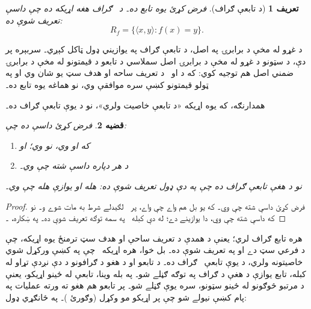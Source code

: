 \documentclass[12pt,a4paper,oneside]{report}
\newcommand{\Setabs}[2]{\{#1 : #2\}}
\newcommand{\tuple}[1]{\langle #1\rangle}
\newcommand{\ollabel}[1]{\label{\pspart:\pschapter:\pssection:#1}}
\newenvironment{explain}{}{}
\newtheorem{defn}{تعريف}[section]
\newtheorem{prop}[defn]{قضيه}
\begin{document}
\begin{defn}[د تابعې ګراف]فرض کړئ  يوه تابع ده۔
د~ \emph{ګراف} هغه اړيکه  ده چې داسې
تعريف شوې ده:
\[
R_f = \Setabs{\tuple{x,y}}{f(x) = y}.
\]
\end{defn}

\begin{explain}
د غړو له مخې د برابرۍ په اصل، د تابعې ګراف په يوازيني ډول ټاکل
کېږي۔ سربېره پر دې، د سټونو د غړو له مخې د برابرۍ اصل سملاسي
د تابعو د قيمتونو له مخې د برابرۍ ضمني اصل هم توجيه کوي: که د
 او~ د تعريف ساحه او هدف سټ يو شان وي او په ټولو قيمتونو
کښې سره موافقې وي، نو هماغه يوه تابع ده۔

همدارنګه، که يوه اړيکه «د تابعې خاصيت ولري»، نو د يوې تابعې ګراف ده۔
\end{explain}

\begin{prop}\ollabel{prop:graph-function}
فرض کړئ  داسې ده چې:
\begin{enumerate}
\item که  او  وي، نو  وي؛ او
\item د هر  دپاره داسې  شته چې \LR{$\tuple{x,
y} \in R$} وي۔
\end{enumerate}
نو  د هغې تابعې  ګراف ده چې په دې ډول
تعريف شوې ده:  هله او يوازې هله چې  وي۔
\end{prop}

\begin{proof}
فرض کړئ داسې  شته چې  وي۔ که يو بل  هم واے
چې  واے، پر~ لګېدلے شرط به مات شوے و۔ نو که داسې 
شته چې  وي، دا  يوازينے دے؛ له دې کبله~ په سمه توګه
تعريف شوې ده۔ په ښکاره، ۔
\end{proof}

\begin{explain}
هره تابع  ګراف لري؛ يعنې د همدې د تعريف ساحې
او هدف سټ ترمنځ يوه اړيکه، چې د  فرعي سټ دے او په 
تعريف شوې ده۔ بل خوا، هره اړيکه~ چې په  کښې ورکړل
شوي خاصيتونه ولري، د يوې تابعې~ ګراف ده۔ د
تابعو او د هغو د ګرافونو د دې نږدې تړاو له کبله، تابع يوازې د
هغې د ګراف په توګه ګڼلے شو۔ په بله وينا، تابعې له ځينو اړيکو،
يعنې د مرتبو څوګونو له ځينو سټونو، سره يوې ګڼلے شو۔
 پر تابعو هم هغو ته ورته عمليات په
پام کښې نيولے شو چې پر اړيکو مو وکړل (وګورئ
)۔ په ځانګړي ډول:
\end{explain}
\end{document}
